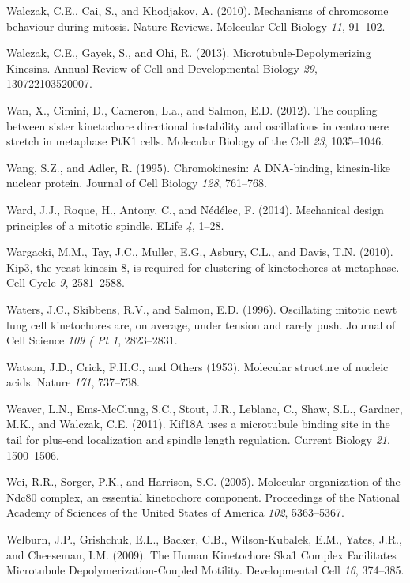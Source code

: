 \documentclass[12pt,a4paper,twoside,openright]{book}
\begin{document}
\hypertarget{ref-Walczak2010}{}
Walczak, C.E., Cai, S., and Khodjakov, A. (2010). Mechanisms of
chromosome behaviour during mitosis. Nature Reviews. Molecular Cell
Biology \emph{11}, 91--102.

\hypertarget{ref-Walczak2013a}{}
Walczak, C.E., Gayek, S., and Ohi, R. (2013). Microtubule-Depolymerizing
Kinesins. Annual Review of Cell and Developmental Biology \emph{29},
130722103520007.

\hypertarget{ref-Wan2012}{}
Wan, X., Cimini, D., Cameron, L.a., and Salmon, E.D. (2012). The
coupling between sister kinetochore directional instability and
oscillations in centromere stretch in metaphase PtK1 cells. Molecular
Biology of the Cell \emph{23}, 1035--1046.

\hypertarget{ref-Wang1995}{}
Wang, S.Z., and Adler, R. (1995). Chromokinesin: A DNA-binding,
kinesin-like nuclear protein. Journal of Cell Biology \emph{128},
761--768.

\hypertarget{ref-Ward2014}{}
Ward, J.J., Roque, H., Antony, C., and Nédélec, F. (2014). Mechanical
design principles of a mitotic spindle. ELife \emph{4}, 1--28.

\hypertarget{ref-Wargacki2010}{}
Wargacki, M.M., Tay, J.C., Muller, E.G., Asbury, C.L., and Davis, T.N.
(2010). Kip3, the yeast kinesin-8, is required for clustering of
kinetochores at metaphase. Cell Cycle \emph{9}, 2581--2588.

\hypertarget{ref-Waters1996a}{}
Waters, J.C., Skibbens, R.V., and Salmon, E.D. (1996). Oscillating
mitotic newt lung cell kinetochores are, on average, under tension and
rarely push. Journal of Cell Science \emph{109 ( Pt 1}, 2823--2831.

\hypertarget{ref-watson1953molecular}{}
Watson, J.D., Crick, F.H.C., and Others (1953). Molecular structure of
nucleic acids. Nature \emph{171}, 737--738.

\hypertarget{ref-Weaver2011}{}
Weaver, L.N., Ems-McClung, S.C., Stout, J.R., Leblanc, C., Shaw, S.L.,
Gardner, M.K., and Walczak, C.E. (2011). Kif18A uses a microtubule
binding site in the tail for plus-end localization and spindle length
regulation. Current Biology \emph{21}, 1500--1506.

\hypertarget{ref-Wei2005}{}
Wei, R.R., Sorger, P.K., and Harrison, S.C. (2005). Molecular
organization of the Ndc80 complex, an essential kinetochore component.
Proceedings of the National Academy of Sciences of the United States of
America \emph{102}, 5363--5367.

\hypertarget{ref-Welburn2009}{}
Welburn, J.P., Grishchuk, E.L., Backer, C.B., Wilson-Kubalek, E.M.,
Yates, J.R., and Cheeseman, I.M. (2009). The Human Kinetochore Ska1
Complex Facilitates Microtubule Depolymerization-Coupled Motility.
Developmental Cell \emph{16}, 374--385.
\end{document}
